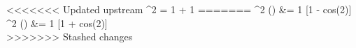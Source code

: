 <<<<<<< Updated upstream
\cos^2 \theta = {1 } + {1 } \theta
=======
\sin^2 (\theta) &= {1 } [1 - cos(2\theta)] \\
\cos^2 (\theta) &= {1 } [1 + cos(2\theta)] \\
>>>>>>> Stashed changes
